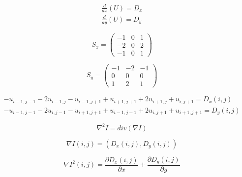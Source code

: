 \documentclass[a4paper,10pt]{article}
\begin{document}
\begin{align*}
\frac{d}{dx}(U) = D_x\\
\frac{d}{dy}(U) = D_y
\end{align*}

\begin{figure}[H]
  \begin{minipage}[b]{0.5\linewidth}
    \centering

    \begin{equation*}
    S_x =
    \begin{pmatrix}
    -1 & 0 & 1 \\
    -2 & 0 & 2\\
    -1 & 0 & 1
    \end{pmatrix}
    \end{equation*}

  \end{minipage}
    \hspace{0.5cm}
  \begin{minipage}[b]{0.5\linewidth}

    \begin{equation*}
    S_y =
    \begin{pmatrix}
    -1 & -2 & -1 \\
    0 & 0 & 0\\
    1 & 2 & 1
    \end{pmatrix}
    \end{equation*}

  \end{minipage}
\end{figure}

\begin{align*}
	- u_{i-1,j-1} -2 u_{i-1,j} - u_{i-1,j+1} + u_{i+1,j+1} + 2 u_{i+1,j} + u_{i,j+1} = D_x(i,j)\\
	- u_{i-1,j-1} -2 u_{i,j-1} - u_{i+1,j+1} + u_{i-1,j-1} + 2 u_{i,j+1} + u_{i+1,j+1} = D_y(i,j)
\end{align*}

\begin{equation*}
\nabla^2 I = div(\nabla I)
\end{equation*}

\begin{equation*}
\nabla I (i,j) = (D_x(i,j), D_y(i,j)) 
\end{equation*}

\begin{equation*}
\nabla I^2(i,j) = \frac{\partial D_x(i,j)}{\partial x} + \frac{\partial D_y(i,j)}{\partial y}
\end{equation*}
\end{document}
